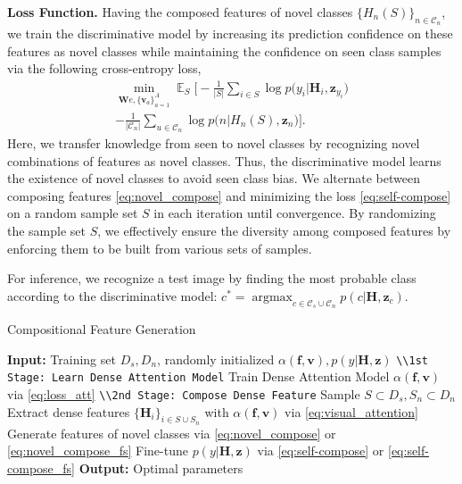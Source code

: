\documentclass[10pt,journal,compsoc]{IEEEtran}
\newcommand{\f}{\boldsymbol{f}}
\newcommand{\z}{\boldsymbol{z}}
\newcommand{\W}{\boldsymbol{W}}
\renewcommand{\v}{\boldsymbol{v}}
\renewcommand{\H}{\boldsymbol{H}}
\DeclareMathOperator{\E}{\mathbb{E}}
\newcommand{\C}{\mathcal{C}}
\newcommand{\1}{\boldsymbol{1}}
\newcommand{\0}{\boldsymbol{0}}
\newcommand{\argmax}{\operatorname{argmax}}
\newcommand{\<}{\langle}
\renewcommand{\>}{\rangle}
\newcommand{\myparagraph}[1]{\vspace{-2pt}\medskip\noindent\textbf{#1}}
\begin{document}
\myparagraph{Loss Function.}
Having the composed features of novel classes $\{H_n(S)\}_{n\in \C_n}$, we train the discriminative model by increasing its prediction confidence on these features as novel classes while maintaining the confidence on seen class samples via the following cross-entropy loss,
\begin{equation}
\begin{split}
\min_{\W{e},\{\v_a\}^A_{a=1}} \E_{S} \Big[-\frac{1}{|S|} \sum_{i\in S} \log p\big(y_i|\H_i,\z_{y_i} \big) \\
- \frac{1}{|\C_n|}\sum_{u\in \C_n} \log p\big(n|H_n(S),\z_n\big) \Big].
\label{eq:self-compose}
\end{split}
\end{equation}
Here, we transfer knowledge from seen to novel classes by recognizing novel combinations of features as novel classes.
Thus, the discriminative model learns the existence of novel classes to avoid seen class bias.
We alternate between composing features \eqref{eq:novel_compose} and minimizing the loss \eqref{eq:self-compose} on a random sample set $S$ in each iteration until convergence.
By randomizing the sample set $S$, we effectively ensure the diversity among composed features by enforcing them to be built from various sets of samples.

For inference, we recognize a test image by finding the most probable class according to the discriminative model: $c^* = \argmax_{c \in \C_s \cup \C_n} p(c|\H,\z_c)$.

\begin{algorithm}[H]
\small
\caption{Compositional Feature Generation}
\label{alg:overall_pipeline}
\begin{algorithmic}
\State \textbf{Input:} Training set $D_s,D_n$, randomly initialized $\alpha(\f,\v),p(y|\H,\z)$
\State \texttt{\textbackslash\textbackslash 1st Stage: Learn Dense Attention Model}
\State Train Dense Attention Model $\alpha(\f,\v)$ via \eqref{eq:loss_att} 
\EndFor
\State \texttt{\textbackslash\textbackslash 2nd Stage: Compose Dense Feature}
\State Sample $S \subset D_s, S_n \subset D_n$
\State Extract dense features $\{\H_{i}\}_{i\in S \cup S_n}$ with $\alpha(\f,\v)$ via \eqref{eq:visual_attention}
\State Generate features of novel classes via \eqref{eq:novel_compose} or \eqref{eq:novel_compose_fs}
\State Fine-tune $p(y|\H,\z)$ via \eqref{eq:self-compose} or \eqref{eq:self-compose_fs}
\EndFor
\State \textbf{Output:} Optimal parameters
\end{algorithmic}
\end{algorithm}
\end{document}
